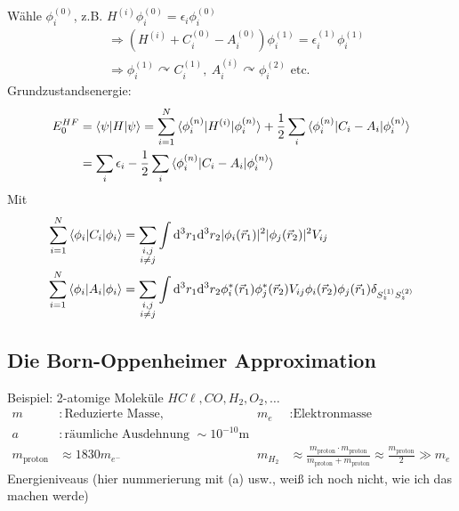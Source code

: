 Wähle $\phi_i^{(0)}$, z.B. $H^{(i)} \phi_i^{(0)} = \epsilon_i \phi_i^{(0)}$
	\begin{align*}
		&\Rightarrow \left(H^{(i)} + C_i^{(0)} - A_i^{(0)}\right) \phi_i^{(1)}
		= \epsilon_i^{(1)} \phi_i^{(1)} \\
		&\Rightarrow \phi_i^{(1)} \curvearrowright C_i^{(1)} 
		,~ A_i^{(i)} \curvearrowright \phi_i^{(2)} \text{ etc.}
	\end{align*}
Grundzustandsenergie: 
	\begin{align*}
		E_0^{HF} &= \braket{\psi | H | \psi} 
		= \sum_{i = 1}^{N} \braket{\phi_i^{(n)} | H^{(i)}| \phi_i^{(n)}}
		+ \frac{1}{2} \sum_i \braket{\phi_i^{(n)} | C_i - A_i | \phi_i^{(n)}} \\
		&= \sum_i \epsilon_i - \frac{1}{2} \sum_i \braket{\phi_i^{(n)} | C_i - A_i | \phi_i^{(n)}}
	\end{align*}
Mit 
	\begin{align*}
		\sum_{i = 1}^{N} \braket{\phi_i | C_i | \phi_i}
		&= \sum_{\substack{i,j \\ i \neq j}}\int \mathrm{d}^3 r_1 \mathrm{d}^3 r_2 |\phi_i (\vec{r}_1)|^2 |\phi_j (\vec{r}_2)|^2 V_{ij} \\
		\sum_{i = 1}^{N} \braket{\phi_i | A_i | \phi_i}
		&= \sum_{\substack{i,j \\ i \neq j}} \int \mathrm{d}^3 r_1 \mathrm{d}^3 r_2 \phi_i^* (\vec{r}_1) \phi_j^* (\vec{r}_2) 
		V_{ij} \phi_i (\vec{r}_2) \phi_j (\vec{r}_1) \delta_{S_z^{(1)} S_z^{(2)}}
	\end{align*}

\subsection{Die Born-Oppenheimer Approximation}
	Beispiel: 2-atomige Moleküle $H C\ell, CO, H_2, O_2, \ldots$ 
		\begin{align*}
			m &: \text{Reduzierte Masse} ,& m_e &: \text{Elektronmasse} \\
			a &: \text{räumliche Ausdehnung } \sim 10^{-10}\mathrm{m} \\
			m_{\text{proton}} &\approx 1830 m_{e^-} &
			m_{H_2} &\approx \frac{m_{\text{proton}} \cdot m_{\text{proton}}}{m_{\text{proton}} + m_{\text{proton}}} \approx \frac{m_{\text{proton}}}{2} \gg m_e
		\end{align*}	
	Energieniveaus (hier nummerierung mit (a) usw., weiß ich noch nicht, wie ich das machen werde)
